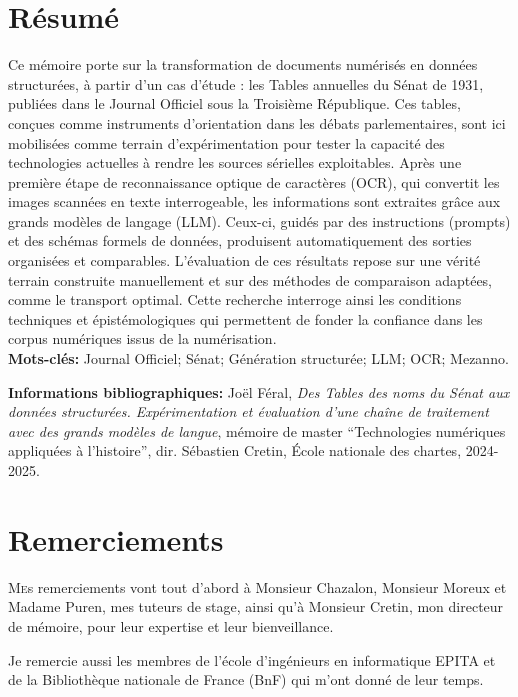 \documentclass[12pt,twoside]{book}
\begin{document}
	\chapter{Résumé}
\medskip
Ce mémoire porte sur la transformation de documents numérisés en données structurées, à partir d’un cas d’étude : les Tables annuelles du Sénat de 1931, publiées dans le Journal Officiel sous la Troisième République. Ces tables, conçues comme instruments d’orientation dans les débats parlementaires, sont ici mobilisées comme terrain d’expérimentation pour tester la capacité des technologies actuelles à rendre les sources sérielles exploitables. Après une première étape de reconnaissance optique de caractères (OCR), qui convertit les images scannées en texte interrogeable, les informations sont extraites grâce aux grands modèles de langage (LLM). Ceux-ci, guidés par des instructions (prompts) et des schémas formels de données, produisent automatiquement des sorties organisées et comparables. L’évaluation de ces résultats repose sur une vérité terrain construite manuellement et sur des méthodes de comparaison adaptées, comme le transport optimal. Cette recherche interroge ainsi les conditions techniques et épistémologiques qui permettent de fonder la confiance dans les corpus numériques issus de la numérisation.\\
	
	\textbf{Mots-clés:} Journal Officiel; Sénat; Génération structurée; LLM; OCR; Mezanno.
	
	\textbf{Informations bibliographiques:} Joël Féral, \textit{Des \textit{Tables des noms} du Sénat aux données structurées. Expérimentation et évaluation d’une chaîne de traitement avec des grands modèles de langue}, mémoire de master \enquote{Technologies numériques appliquées à l'histoire}, dir. Sébastien Cretin, École nationale des chartes, 2024-2025.
	
		\newpage{\pagestyle{empty}\cleardoublepage}
	
	\chapter{Remerciements}
	
\lettrine{M}es remerciements vont tout d'abord à Monsieur Chazalon, Monsieur Moreux et Madame Puren, mes tuteurs de stage, ainsi qu'à Monsieur Cretin, mon directeur de mémoire, pour leur expertise et leur bienveillance.

Je remercie aussi les membres de l'école d'ingénieurs en informatique EPITA et de la Bibliothèque nationale de France (BnF) qui m'ont donné de leur temps.
\end{document}
